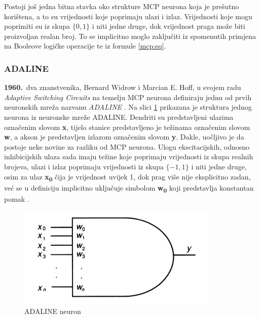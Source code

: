 \documentclass[times, utf8, zavrsni]{fer}
\begin{document}
Postoji još jedna bitna stavka oko strukture MCP neurona koja je prešutno korištena, a to su vrijednosti koje poprimaju ulazi i izlaz. Vrijednosti koje mogu poprimiti su iz skupa $\{0, 1\}$ i niti jedne druge, dok vrijednost praga može biti proizvoljan realan broj. To se implicitno moglo zaključiti iz spomenutih primjena na Booleove logičke operacije te iz formule \eqref{mcp:eq}.

\subsubsection{ADALINE}
\textbf{1960.}\ dva znanstvenika, Bernard Widrow i Marcian E. Hoff, u svojem radu \textit{Adaptive Switching Circuits} na temelju MCP neurona definiraju jednu od prvih neuronskih mreža nazvanu \textit{ADALINE} . Na slici \ref{fig:adaline-neuron} prikazana je struktura jednog neurona iz neuronske mreže ADALINE. Dendriti su predstavljeni ulazima označenim slovom \textbf{x}, tijelo stanice predstavljeno je težinama označenim slovom \textbf{w}, a akson je predstavljen izlazom označenim slovom \textbf{y}. Dakle, uočljivo je da postoje neke novine za razliku od MCP neurona. Ulogu ekscitacijskih, odnosno inhibicijskih ulaza sada imaju težine koje poprimaju vrijednosti iz skupa realnih brojeva, ulazi i izlaz poprimaju vrijednosti iz skupa $\{-1, 1\}$ i niti jedne druge, osim za ulaz \textbf{x\textsubscript{0}} čija je vrijednost uvijek 1, dok prag više nije eksplicitno zadan, već se u definiciju implicitno uključuje simbolom \textbf{w\textsubscript{0}} koji predstavlja konstantan pomak  \citep{picton2000}.

\begin{figure}[H]
    \centering
    \includegraphics{img/adaline-neuron.png}
    \caption[Caption for LOF]{ADALINE neuron\footnotemark}
    \label{fig:adaline-neuron}
\end{figure}
\end{document}

